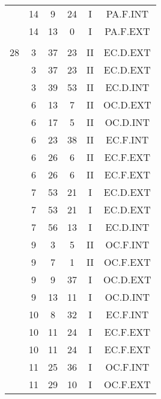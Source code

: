 \documentclass[12pt, a4paper]{article}
\begin{document}
\begin{multicols}{3}
{\begin{tabular}{c c c c c c}
	 	 	 	 & 14 & 9 & 24 & I & PA.F.INT\\%
	 	 	 	 & 14 & 13 & 0 & I & PA.F.EXT\\%
	 	 	 	 & & & & & \\%
	 	 	 	28 & 3 & 37 & 23 & II & EC.D.EXT\\%
	 	 	 	 & 3 & 37 & 23 & II & EC.D.EXT\\%
	 	 	 	 & 3 & 39 & 53 & II & EC.D.INT\\%
	 	 	 	 & 6 & 13 & 7 & II & OC.D.EXT\\%
	 	 	 	 & 6 & 17 & 5 & II & OC.D.INT\\%
	 	 	 	 & 6 & 23 & 38 & II & EC.F.INT\\%
	 	 	 	 & 6 & 26 & 6 & II & EC.F.EXT\\%
	 	 	 	 & 6 & 26 & 6 & II & EC.F.EXT\\%
	 	 	 	 & 7 & 53 & 21 & I & EC.D.EXT\\%
	 	 	 	 & 7 & 53 & 21 & I & EC.D.EXT\\%
	 	 	 	 & 7 & 56 & 13 & I & EC.D.INT\\%
	 	 	 	 & 9 & 3 & 5 & II & OC.F.INT\\%
	 	 	 	 & 9 & 7 & 1 & II & OC.F.EXT\\%
	 	 	 	 & 9 & 9 & 37 & I & OC.D.EXT\\%
	 	 	 	 & 9 & 13 & 11 & I & OC.D.INT\\%
	 	 	 	 & 10 & 8 & 32 & I & EC.F.INT\\%
	 	 	 	 & 10 & 11 & 24 & I & EC.F.EXT\\%
	 	 	 	 & 10 & 11 & 24 & I & EC.F.EXT\\%
	 	 	 	 & 11 & 25 & 36 & I & OC.F.INT\\%
	 	 	 	 & 11 & 29 & 10 & I & OC.F.EXT\\%

\end{tabular}}
\end{multicols}
\end{document}

